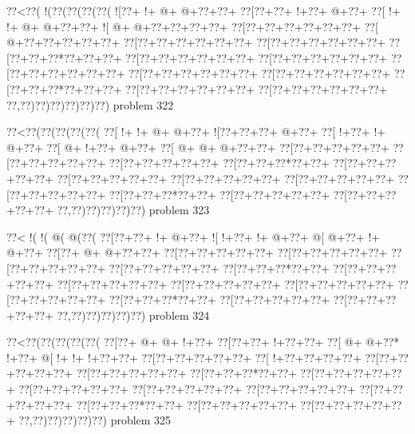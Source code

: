 \vbox{\vbox{\goo
\0??<\0??(\- !(\0??(\0??(\0??(\0??(
\- ![\0??+\- !+\- @+\- @+\0??+\0??+
\0??[\0??+\0??+\- !+\0??+\- @+\0??+
\0??[\- !+\- !+\- @+\- @+\0??+\0??+
\- ![\- @+\- @+\0??+\0??+\0??+\0??+
\0??[\0??+\0??+\0??+\0??+\0??+\0??+
\0??[\- @+\0??+\0??+\0??+\0??+\0??+
\0??[\0??+\0??+\0??+\0??+\0??+\0??+
\0??[\0??+\0??+\0??+\0??+\0??+\0??+
\0??[\0??+\0??+\0??*\0??+\0??+\0??+
\0??[\0??+\0??+\0??+\0??+\0??+\0??+
\0??[\0??+\0??+\0??+\0??+\0??+\0??+
\0??[\0??+\0??+\0??+\0??+\0??+\0??+
\0??[\0??+\0??+\0??+\0??+\0??+\0??+
\0??[\0??+\0??+\0??+\0??+\0??+\0??+
\0??[\0??+\0??+\0??*\0??+\0??+\0??+
\0??[\0??+\0??+\0??+\0??+\0??+\0??+
\0??[\0??+\0??+\0??+\0??+\0??+\0??+
\0??,\0??)\0??)\0??)\0??)\0??)\0??)
}
\hfil problem 322\hfil\break
}

\vbox{\vbox{\goo
\0??<\0??(\0??(\0??(\0??(\0??(
\0??[\- !+\- !+\- @+\- @+\0??+
\- ![\0??+\0??+\0??+\- @+\0??+
\0??[\- !+\0??+\- !+\- @+\0??+
\0??[\- @+\- !+\0??+\- @+\0??+
\0??[\- @+\- @+\- @+\0??+\0??+
\0??[\0??+\0??+\0??+\0??+\0??+
\0??[\0??+\0??+\0??+\0??+\0??+
\0??[\0??+\0??+\0??+\0??+\0??+
\0??[\0??+\0??+\0??*\0??+\0??+
\0??[\0??+\0??+\0??+\0??+\0??+
\0??[\0??+\0??+\0??+\0??+\0??+
\0??[\0??+\0??+\0??+\0??+\0??+
\0??[\0??+\0??+\0??+\0??+\0??+
\0??[\0??+\0??+\0??+\0??+\0??+
\0??[\0??+\0??+\0??*\0??+\0??+
\0??[\0??+\0??+\0??+\0??+\0??+
\0??[\0??+\0??+\0??+\0??+\0??+
\0??,\0??)\0??)\0??)\0??)\0??)
}
\hfil problem 323\hfil\break
}

\vbox{\vbox{\goo
\0??<\- !(\- !(\- @(\- @(\0??(
\0??[\0??+\0??+\- !+\- @+\0??+
\- ![\- !+\0??+\- !+\- @+\0??+
\- @[\- @+\0??+\- !+\- @+\0??+
\0??[\0??+\- @+\- @+\0??+\0??+
\0??[\0??+\0??+\0??+\0??+\0??+
\0??[\0??+\0??+\0??+\0??+\0??+
\0??[\0??+\0??+\0??+\0??+\0??+
\0??[\0??+\0??+\0??+\0??+\0??+
\0??[\0??+\0??+\0??*\0??+\0??+
\0??[\0??+\0??+\0??+\0??+\0??+
\0??[\0??+\0??+\0??+\0??+\0??+
\0??[\0??+\0??+\0??+\0??+\0??+
\0??[\0??+\0??+\0??+\0??+\0??+
\0??[\0??+\0??+\0??+\0??+\0??+
\0??[\0??+\0??+\0??*\0??+\0??+
\0??[\0??+\0??+\0??+\0??+\0??+
\0??[\0??+\0??+\0??+\0??+\0??+
\0??,\0??)\0??)\0??)\0??)\0??)
}
\hfil problem 324\hfil\break
}

\vbox{\vbox{\goo
\0??<\0??(\0??(\0??(\0??(\0??(
\0??[\0??+\- @+\- @+\- !+\0??+
\0??[\0??+\0??+\- !+\0??+\0??+
\0??[\- @+\- @+\0??*\- !+\0??+
\- @[\- !+\- !+\- !+\0??+\0??+
\0??[\0??+\0??+\0??+\0??+\0??+
\0??[\- !+\0??+\0??+\0??+\0??+
\0??[\0??+\0??+\0??+\0??+\0??+
\0??[\0??+\0??+\0??+\0??+\0??+
\0??[\0??+\0??+\0??*\0??+\0??+
\0??[\0??+\0??+\0??+\0??+\0??+
\0??[\0??+\0??+\0??+\0??+\0??+
\0??[\0??+\0??+\0??+\0??+\0??+
\0??[\0??+\0??+\0??+\0??+\0??+
\0??[\0??+\0??+\0??+\0??+\0??+
\0??[\0??+\0??+\0??*\0??+\0??+
\0??[\0??+\0??+\0??+\0??+\0??+
\0??[\0??+\0??+\0??+\0??+\0??+
\0??,\0??)\0??)\0??)\0??)\0??)
}
\hfil problem 325\hfil\break
}

